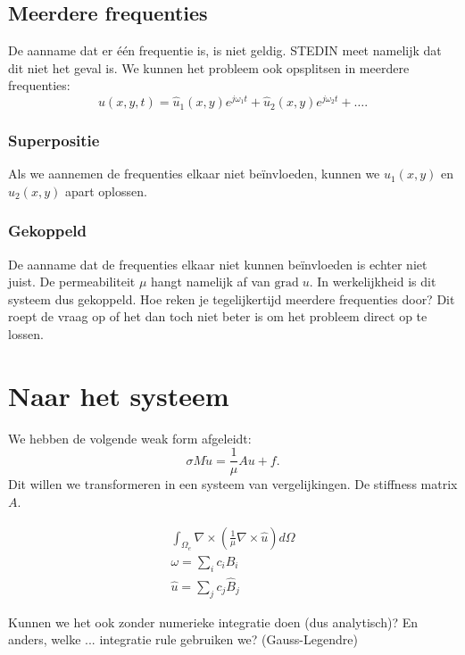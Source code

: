 \documentclass[11pt]{article}
\begin{document}
\subsection{Meerdere frequenties}
De aanname dat er één frequentie is, is niet geldig. STEDIN meet namelijk dat dit niet het geval is. We kunnen het probleem ook opsplitsen in meerdere frequenties:
\begin{equation}
    u(x,y,t) = \hat u_1(x,y) e^{j\omega_1 t} + \hat u_2(x,y) e^{j\omega_2 t} + \dots.
\end{equation}

\subsubsection{Superpositie}
Als we aannemen de frequenties elkaar niet beïnvloeden, kunnen we $\hat u_1(x,y)$ en $\hat u_2(x,y)$ apart oplossen.

\subsubsection{Gekoppeld}
De aanname dat de frequenties elkaar niet kunnen beïnvloeden is echter niet juist. De permeabiliteit $\mu$ hangt namelijk af van $\text{grad} \; u$. In werkelijkheid is dit systeem dus gekoppeld. Hoe reken je tegelijkertijd meerdere frequenties door? Dit roept de vraag op of het dan toch niet beter is om het probleem direct op te lossen.


\section{Naar het systeem}

We hebben de volgende weak form afgeleidt:
\begin{equation}
    \sigma M \dot u = \frac{1}{\mu}A u + f.
\end{equation}
Dit willen we transformeren in een systeem van vergelijkingen. De stiffness matrix $A$.

\begin{align*}
    \int_{\Omega_e} \nabla \times \left(\frac{1}{\mu} \nabla \times \hat u\right) d \Omega \\
    \omega = \sum_i c_i B_i\\
    \hat u = \sum_j c_j \hat B_j
\end{align*}

Kunnen we het ook zonder numerieke integratie doen (dus analytisch)? En anders, welke ... integratie rule gebruiken we? (Gauss-Legendre)
\end{document}
